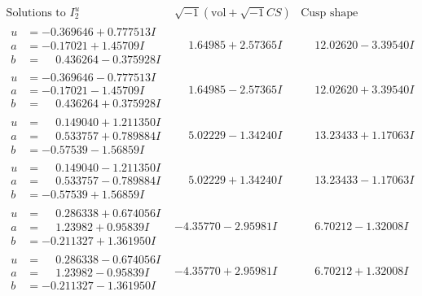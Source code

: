 \documentclass[1p]{elsarticle_modified}
\theoremstyle{definition}
\newcommand{\I}{\sqrt{-1}}
\begin{document}
$$\begin{array}{c|c|c}  
\text{Solutions to }I^u_{2}& \I (\text{vol} + \sqrt{-1}CS) & \text{Cusp shape}\\
 \hline 
\begin{aligned}
u &= -0.369646 + 0.777513 I \\
a &= -0.17021 + 1.45709 I \\
b &= \phantom{-}0.436264 - 0.375928 I\end{aligned}
 & \phantom{-}1.64985 + 2.57365 I & \phantom{-}12.02620 - 3.39540 I \\ \hline\begin{aligned}
u &= -0.369646 - 0.777513 I \\
a &= -0.17021 - 1.45709 I \\
b &= \phantom{-}0.436264 + 0.375928 I\end{aligned}
 & \phantom{-}1.64985 - 2.57365 I & \phantom{-}12.02620 + 3.39540 I \\ \hline\begin{aligned}
u &= \phantom{-}0.149040 + 1.211350 I \\
a &= \phantom{-}0.533757 + 0.789884 I \\
b &= -0.57539 - 1.56859 I\end{aligned}
 & \phantom{-}5.02229 - 1.34240 I & \phantom{-}13.23433 + 1.17063 I \\ \hline\begin{aligned}
u &= \phantom{-}0.149040 - 1.211350 I \\
a &= \phantom{-}0.533757 - 0.789884 I \\
b &= -0.57539 + 1.56859 I\end{aligned}
 & \phantom{-}5.02229 + 1.34240 I & \phantom{-}13.23433 - 1.17063 I \\ \hline\begin{aligned}
u &= \phantom{-}0.286338 + 0.674056 I \\
a &= \phantom{-}1.23982 + 0.95839 I \\
b &= -0.211327 + 1.361950 I\end{aligned}
 & -4.35770 - 2.95981 I & \phantom{-}6.70212 - 1.32008 I \\ \hline\begin{aligned}
u &= \phantom{-}0.286338 - 0.674056 I \\
a &= \phantom{-}1.23982 - 0.95839 I \\
b &= -0.211327 - 1.361950 I\end{aligned}
 & -4.35770 + 2.95981 I & \phantom{-}6.70212 + 1.32008 I \\ \hline\begin{aligned}

\end{aligned}
\end{array}$$
\end{document}
